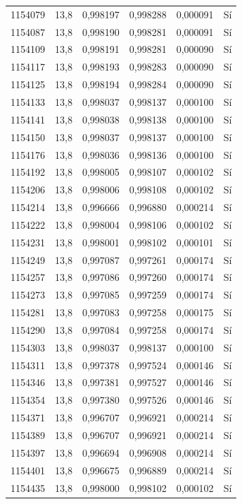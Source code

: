 \begin{longtable}{lccccc}
1154079 & 13,8 & 0,998197 & 0,998288 & 0,000091 & Sí \\
1154087 & 13,8 & 0,998190 & 0,998281 & 0,000091 & Sí \\
1154109 & 13,8 & 0,998191 & 0,998281 & 0,000090 & Sí \\
1154117 & 13,8 & 0,998193 & 0,998283 & 0,000090 & Sí \\
1154125 & 13,8 & 0,998194 & 0,998284 & 0,000090 & Sí \\
1154133 & 13,8 & 0,998037 & 0,998137 & 0,000100 & Sí \\
1154141 & 13,8 & 0,998038 & 0,998138 & 0,000100 & Sí \\
1154150 & 13,8 & 0,998037 & 0,998137 & 0,000100 & Sí \\
1154176 & 13,8 & 0,998036 & 0,998136 & 0,000100 & Sí \\
1154192 & 13,8 & 0,998005 & 0,998107 & 0,000102 & Sí \\
1154206 & 13,8 & 0,998006 & 0,998108 & 0,000102 & Sí \\
1154214 & 13,8 & 0,996666 & 0,996880 & 0,000214 & Sí \\
1154222 & 13,8 & 0,998004 & 0,998106 & 0,000102 & Sí \\
1154231 & 13,8 & 0,998001 & 0,998102 & 0,000101 & Sí \\
1154249 & 13,8 & 0,997087 & 0,997261 & 0,000174 & Sí \\
1154257 & 13,8 & 0,997086 & 0,997260 & 0,000174 & Sí \\
1154273 & 13,8 & 0,997085 & 0,997259 & 0,000174 & Sí \\
1154281 & 13,8 & 0,997083 & 0,997258 & 0,000175 & Sí \\
1154290 & 13,8 & 0,997084 & 0,997258 & 0,000174 & Sí \\
1154303 & 13,8 & 0,998037 & 0,998137 & 0,000100 & Sí \\
1154311 & 13,8 & 0,997378 & 0,997524 & 0,000146 & Sí \\
1154346 & 13,8 & 0,997381 & 0,997527 & 0,000146 & Sí \\
1154354 & 13,8 & 0,997380 & 0,997526 & 0,000146 & Sí \\
1154371 & 13,8 & 0,996707 & 0,996921 & 0,000214 & Sí \\
1154389 & 13,8 & 0,996707 & 0,996921 & 0,000214 & Sí \\
1154397 & 13,8 & 0,996694 & 0,996908 & 0,000214 & Sí \\
1154401 & 13,8 & 0,996675 & 0,996889 & 0,000214 & Sí \\
1154435 & 13,8 & 0,998000 & 0,998102 & 0,000102 & Sí \\

\end{longtable}
